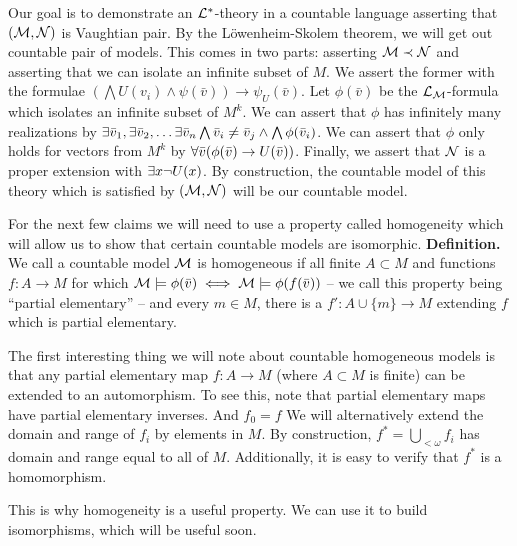 Our goal is to demonstrate an \(\mathcal{L}^*\)-theory in a countable language asserting that \((\mathcal{M}, \mathcal{N})\) is Vaughtian pair.
By the L\"owenheim-Skolem theorem, we will get out countable pair of models.
This comes in two parts: asserting \(\mathcal{M} \prec \mathcal{N}\) and asserting that we can isolate an infinite subset of \(M\). 
We assert the former with the formulae \((\bigwedge U(v_i) \land \psi(\bar{v})) \to \psi_U(\bar{v})\). 
Let \(\phi(\bar{v})\) be the \(\mathcal{L}_{\mathcal{M}}\)-formula which isolates an infinite subset of \(M^k\). 
We can assert that \(\phi\) has infinitely many realizations by \(\exists \bar{v}_1, \exists \bar{v}_2, \ldots \exists \bar{v}_n \bigwedge \bar{v}_i \neq \bar{v}_j \land \bigwedge \phi(\bar{v}_i)\). %
We can assert that \(\phi\) only holds for vectors from \(M^k\) by \(\forall \bar{v} (\phi(\bar{v}) \to U(\bar{v}))\).
Finally, we assert that \(\mathcal{N}\) is a proper extension with \(\exists x \neg U(x)\). 
By construction, the countable model of this theory which is satisfied by \((\mathcal{M}, \mathcal{N})\) will be our countable model.

For the next few claims we will need to use a property called homogeneity which will allow us to show that certain countable models are isomorphic.
\textbf{Definition.} We call a countable model \(\mathcal{M}\) is homogeneous if all finite \(A \subset M\) and functions \(f: A \to M\) for which \(\mathcal{M} \models \phi(\bar{v}) \iff \mathcal{M} \models \phi(f(\bar{v}))\) -- we call this property being ``partial elementary'' -- and every \(m \in M\), there is a \(f': A \cup \{m\} \to M\) extending \(f\) which is partial elementary. %

The first interesting thing we will note about countable homogeneous models is that any partial elementary map \(f: A \to M\) (where \(A \subset M\) is finite) can be extended to an automorphism. 
To see this, note that partial elementary maps have partial elementary inverses. And \(f_0 = f\) %
We will alternatively extend the domain and range of \(f_i\) by elements in \(M\). 
By construction, \(f^* = \bigcup_{<\omega}f_i\) has domain and range equal to all of \(M\). %
Additionally, it is easy to verify that \(f^*\) is a homomorphism. 

This is why homogeneity is a useful property. We can use it to build isomorphisms, which will be useful soon. 

